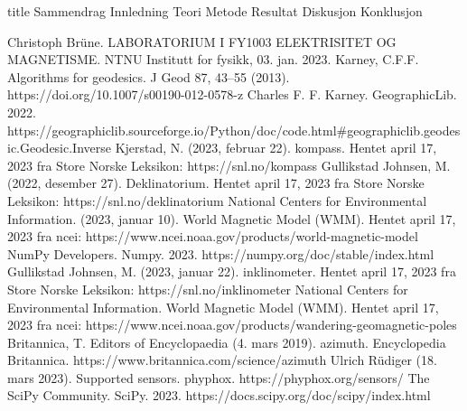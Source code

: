 \documentclass[5p]{article}
\begin{document}
{title} %
{Sammendrag}
\pagebreak
{Innledning}
{Teori}
{Metode}
{Resultat}
{Diskusjon}
{Konklusjon}

\begin{thebibliography}{5}
Christoph Brüne. LABORATORIUM I FY1003 ELEKTRISITET OG MAGNETISME. NTNU Institutt for fysikk, 03. jan. 2023.
 Karney, C.F.F. Algorithms for geodesics. J Geod 87, 43–55 (2013). https://doi.org/10.1007/s00190-012-0578-z
 Charles F. F. Karney. GeographicLib. 2022. \\
https://geographiclib.sourceforge.io/Python/doc/code.html\#geographiclib.geodesic.Geodesic.Inverse
Kjerstad, N. (2023, februar 22). kompass. Hentet april 17, 2023 fra Store Norske Leksikon: https://snl.no/kompass
Gullikstad Johnsen, M. (2022, desember 27). Deklinatorium. Hentet april 17, 2023 fra Store Norske Leksikon: https://snl.no/deklinatorium
National Centers for Environmental Information. (2023, januar 10). World Magnetic Model (WMM). Hentet april 17, 
2023 fra ncei: https://www.ncei.noaa.gov/products/world-magnetic-model
 NumPy Developers. Numpy. 2023. https://numpy.org/doc/stable/index.html
Gullikstad Johnsen, M. (2023, januar 22). inklinometer. Hentet april 17, 2023 fra Store Norske Leksikon: https://snl.no/inklinometer
National Centers for Environmental Information. World Magnetic Model (WMM). Hentet april 17, 
2023 fra ncei: https://www.ncei.noaa.gov/products/wandering-geomagnetic-poles
 Britannica, T. Editors of Encyclopaedia (4. mars 2019). azimuth. Encyclopedia Britannica. https://www.britannica.com/science/azimuth
 Ulrich Rüdiger (18. mars 2023). Supported sensors. phyphox. 
https://phyphox.org/sensors/
 The SciPy Community. SciPy. 2023. 
https://docs.scipy.org/doc/scipy/index.html
\end{thebibliography}
\end{document}
